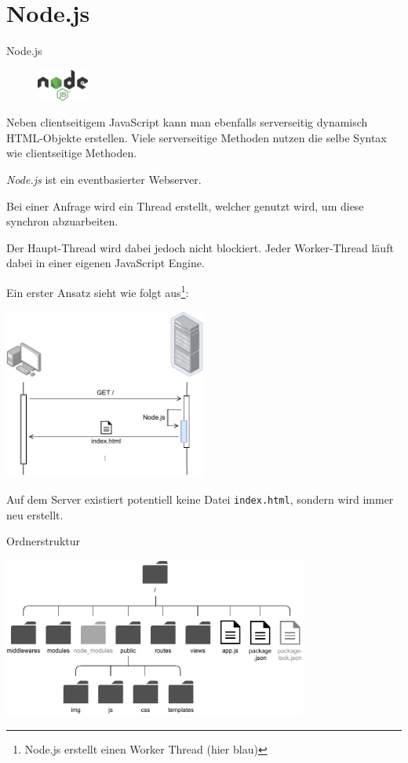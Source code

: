 \section{Node.js}

\begin{defi}{Node.js}
    \begin{figure}
        \centering
        \includegraphics[width=0.15\textwidth]{includes/figures/defi_node_js.png}
    \end{figure}
    Neben clientseitigem JavaScript kann man ebenfalls serverseitig dynamisch HTML-Objekte erstellen.
    Viele serverseitige Methoden nutzen die selbe Syntax wie clientseitige Methoden.

    \emph{Node.js} ist ein eventbasierter Webserver.

    Bei einer Anfrage wird ein Thread erstellt, welcher genutzt wird, um diese synchron abzuarbeiten.

    Der Haupt-Thread wird dabei jedoch nicht blockiert.
    Jeder Worker-Thread läuft dabei in einer eigenen JavaScript Engine.

    Ein erster Ansatz sieht wie folgt aus\footnote{Node.js erstellt einen Worker Thread (hier blau)}:
    \begin{center}
        \includegraphics[width=0.5\textwidth]{includes/figures/defi_js_server.pdf}
    \end{center}
    Auf dem Server existiert potentiell keine Datei \texttt{index.html}, sondern wird immer neu erstellt.
\end{defi}

\begin{example}{Ordnerstruktur}
    \begin{center}
        \includegraphics[width=0.75\textwidth]{includes/figures/example_nodejs_ordnerstruktur.pdf}
    \end{center}
\end{example}

